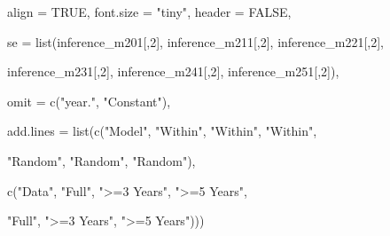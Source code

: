 \documentclass[a4paper,nobind]{templates/ociamthesis}
\newenvironment{Shaded}{\begin{snugshade}}{\end{snugshade}}
\newcommand{\AttributeTok}[1]{\textcolor[rgb]{0.77,0.63,0.00}{#1}}
\newcommand{\ConstantTok}[1]{\textcolor[rgb]{0.00,0.00,0.00}{#1}}
\newcommand{\DecValTok}[1]{\textcolor[rgb]{0.00,0.00,0.81}{#1}}
\newcommand{\FunctionTok}[1]{\textcolor[rgb]{0.00,0.00,0.00}{#1}}
\newcommand{\NormalTok}[1]{#1}
\newcommand{\StringTok}[1]{\textcolor[rgb]{0.31,0.60,0.02}{#1}}
\renewenvironment{Shaded}
{
  \vspace{10pt}%
  \begin{snugshade}%
}{%
  \end{snugshade}%
  \vspace{8pt}%
}
\begin{document}
\begin{landscape}
\begin{Shaded}
\begin{Highlighting}[]
          \AttributeTok{align =} \ConstantTok{TRUE}\NormalTok{, }\AttributeTok{font.size =} \StringTok{"tiny"}\NormalTok{, }\AttributeTok{header =} \ConstantTok{FALSE}\NormalTok{, }
          
          \AttributeTok{se =} \FunctionTok{list}\NormalTok{(inference\_m201[,}\DecValTok{2}\NormalTok{], inference\_m211[,}\DecValTok{2}\NormalTok{], inference\_m221[,}\DecValTok{2}\NormalTok{], }
          
\NormalTok{          inference\_m231[,}\DecValTok{2}\NormalTok{], inference\_m241[,}\DecValTok{2}\NormalTok{], inference\_m251[,}\DecValTok{2}\NormalTok{]),}
          
          \AttributeTok{omit =} \FunctionTok{c}\NormalTok{(}\StringTok{"year."}\NormalTok{, }\StringTok{"Constant"}\NormalTok{),}
          
          \AttributeTok{add.lines =} \FunctionTok{list}\NormalTok{(}\FunctionTok{c}\NormalTok{(}\StringTok{"Model"}\NormalTok{, }\StringTok{"Within"}\NormalTok{, }\StringTok{"Within"}\NormalTok{, }\StringTok{"Within"}\NormalTok{, }
                        
                        \StringTok{"Random"}\NormalTok{, }\StringTok{"Random"}\NormalTok{, }\StringTok{"Random"}\NormalTok{), }
          
          \FunctionTok{c}\NormalTok{(}\StringTok{"Data"}\NormalTok{, }\StringTok{"Full"}\NormalTok{, }\StringTok{"\textgreater{}=3 Years"}\NormalTok{, }\StringTok{"\textgreater{}=5 Years"}\NormalTok{, }
            
            \StringTok{"Full"}\NormalTok{, }\StringTok{"\textgreater{}=3 Years"}\NormalTok{, }\StringTok{"\textgreater{}=5 Years"}\NormalTok{)))}
\end{Highlighting}
\end{Shaded}


\end{landscape}
\end{document}
